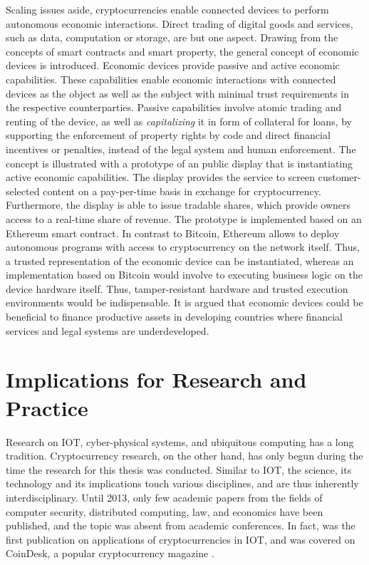 Scaling issues aside, cryptocurrencies enable connected devices to perform autonomous economic interactions. Direct trading of digital goods and services, such as data, computation or storage, are but one aspect. Drawing from the concepts of smart contracts and smart property, the general concept of economic devices is introduced. Economic devices provide passive and active economic capabilities. These capabilities enable economic interactions with connected devices as the object as well as the subject with minimal trust requirements in the respective counterparties. 
Passive capabilities involve atomic trading and renting of the device, as well as \emph{capitalizing} it in form of collateral for loans, by supporting the enforcement of property rights by code and direct financial incentives or penalties, instead of the legal system and human enforcement. The concept is illustrated with a prototype of an public display that is instantiating active economic capabilities. The display provides the service to screen customer-selected content on a pay-per-time basis in exchange for cryptocurrency. Furthermore, the display is able to issue tradable shares, which provide owners access to a real-time share of revenue. The prototype is implemented based on an Ethereum smart contract. In contrast to Bitcoin, Ethereum allows to deploy autonomous programs with access to cryptocurrency on the network itself. Thus, a trusted representation of the economic device can be instantiated, whereas an implementation based on Bitcoin would involve to executing business logic on the device hardware itself. Thus, tamper-resistant hardware and trusted execution environments would be indispensable. It is argued that economic devices could be beneficial to finance productive assets in developing countries where financial services and legal systems are underdeveloped.


\section{Implications for Research and Practice}

Research on \ac{IOT}, cyber-physical systems, and ubiquitous computing has a long tradition. Cryptocurrency research, on the other hand, has only begun during the time the research for this thesis was conducted. Similar to \ac{IOT}, the science, its technology and its implications touch various disciplines, and are thus inherently interdisciplinary. Until 2013, only few academic papers from the fields of computer security, distributed computing, law, and economics have been published, and the topic was absent from academic conferences. In fact, \cite{Worner:2014:YSE:2638728.2638786} was the first publication on applications of cryptocurrencies in \ac{IOT}, and was covered on CoinDesk, a popular cryptocurrency magazine \parencite{Coindesk2014}. 

